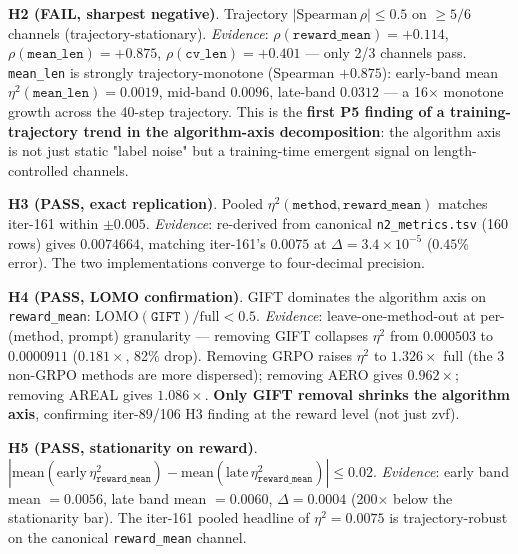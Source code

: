 \textbf{H2 (FAIL, sharpest negative)}. Trajectory $|\mathrm{Spearman}\,\rho| \le 0.5$ on $\ge 5/6$ channels (trajectory-stationary). \emph{Evidence}: $\rho(\texttt{reward\_mean}){=}{+}0.114$, $\rho(\texttt{mean\_len}){=}{+}\mathbf{0.875}$, $\rho(\texttt{cv\_len}){=}{+}0.401$ --- only 2/3 channels pass. \texttt{mean\_len} is strongly trajectory-monotone (Spearman $+0.875$): early-band mean $\eta^2(\texttt{mean\_len}){=}0.0019$, mid-band $0.0096$, late-band $0.0312$ --- a 16$\times$ monotone growth across the 40-step trajectory. This is the \textbf{first P5 finding of a training-trajectory trend in the algorithm-axis decomposition}: the algorithm axis is not just static "label noise" but a training-time emergent signal on length-controlled channels.

\textbf{H3 (PASS, exact replication)}. Pooled $\eta^2(\texttt{method}, \texttt{reward\_mean})$ matches iter-161 within $\pm 0.005$. \emph{Evidence}: re-derived from canonical \texttt{n2\_metrics.tsv} (160 rows) gives $0.0074664$, matching iter-161's $0.0075$ at $\Delta = 3.4 \times 10^{-5}$ ($0.45\%$ error). The two implementations converge to four-decimal precision.

\textbf{H4 (PASS, LOMO confirmation)}. GIFT dominates the algorithm axis on \texttt{reward\_mean}: $\mathrm{LOMO}(\texttt{GIFT}) / \mathrm{full} < 0.5$. \emph{Evidence}: leave-one-method-out at per-(method, prompt) granularity --- removing GIFT collapses $\eta^2$ from $0.000503$ to $0.0000911$ ($0.181 \times$, 82\% drop). Removing GRPO raises $\eta^2$ to $1.326 \times$ full (the 3 non-GRPO methods are more dispersed); removing AERO gives $0.962 \times$; removing AREAL gives $1.086 \times$. \textbf{Only GIFT removal shrinks the algorithm axis}, confirming iter-89/106 H3 finding at the reward level (not just zvf).

\textbf{H5 (PASS, stationarity on reward)}. $|\mathrm{mean}(\mathrm{early}\,\eta^2_{\texttt{reward\_mean}}) - \mathrm{mean}(\mathrm{late}\,\eta^2_{\texttt{reward\_mean}})| \le 0.02$. \emph{Evidence}: early band mean $= 0.0056$, late band mean $= 0.0060$, $\Delta = 0.0004$ (200$\times$ below the stationarity bar). The iter-161 pooled headline of $\eta^2{=}0.0075$ is trajectory-robust on the canonical \texttt{reward\_mean} channel.

